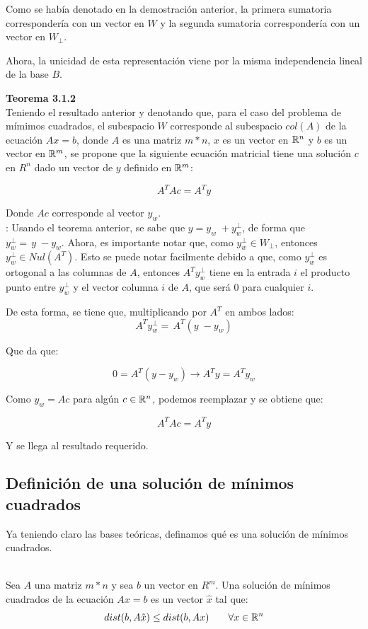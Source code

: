 {{{{Como se había denotado en la demostración anterior, la primera sumatoria correspondería con un vector en $W$ y la segunda sumatoria correspondería con un vector en $W_\perp$.

Ahora, la unicidad de esta representación viene por la misma independencia lineal de la base $B$.

\textbf{Teorema 3.1.2} \\
Teniendo el resultado anterior y denotando que, para el caso del problema de mímimos cuadrados, el subespacio $W$ corresponde al subespacio $col(A)$ de la ecuación $Ax = b$, donde $A $ es una matriz $m*n$, $x$ es un vector en $\mathbb{R}^n$ y $b$ es un vector en $\mathbb{R}^m$, se propone que la siguiente ecuación matricial tiene una solución $c$ en $R^n$ dado un vector de $y$ definido en $\mathbb{R}^m$:

$$A^TAc = A^Ty$$

Donde $Ac$ corresponde al vector $y_w$. \\

: Usando el teorema anterior, se sabe que $y = y_w \; + y_{w}^\perp$, de forma que $y_w^\perp =\, y \;- y_w$. Ahora, es importante notar que, como $y_w^\perp \in W_\perp$, entonces $y_w^\perp \in Nul(A^T)$. Esto se puede notar facilmente debido a que, como $y_w^\perp$ es ortogonal a las columnas de $A$, entonces $A^Ty_w^\perp$ tiene en la entrada $i$ el producto punto entre $y_w^\perp$ y el vector columna $i$ de $A$, que será 0 para cualquier $i$. 

De esta forma, se tiene que, multiplicando por $A^T$ en ambos lados: 
$$ A^Ty_w^\perp =\, A^T(y \;- y_w)
$$

Que da que:

$$ 0 = A^T(y - y_w)  \rightarrow A^Ty = A^Ty_w
$$

Como $y_w = Ac$ para algún $c \in \mathbb{R}^n$, podemos reemplazar y se obtiene que:

$$A^TAc = A^Ty$$

Y se llega al resultado requerido.

\subsection{Definición de una solución de mínimos cuadrados}

Ya teniendo claro las bases teóricas, definamos qué es una solución de mínimos cuadrados. 

\\ Sea $A$ una matriz $m*n$ y sea $b$ un vector en $R^m$. Una solución de mínimos cuadrados de la ecuación $Ax = b$ es un vector $\hat{x}$ tal que:
$$ dist (b, A\hat{x}) \le dist(b, Ax) \;\;\;\;\;\;\; \forall x \in \mathbb{R}^n
$$

}}}}
